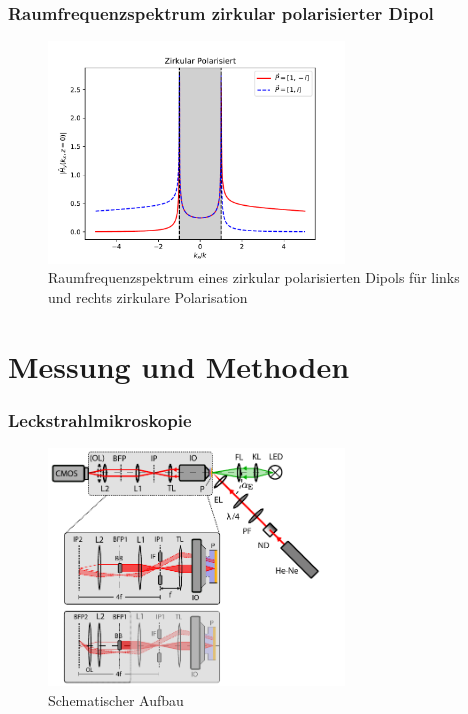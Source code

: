 \documentclass[aspectratio=1610]{beamer}
\begin{document}
		\begin{frame}
			\frametitle{Raumfrequenzspektrum zirkular polarisierter Dipol}
			\begin{figure}[h]
				\centering
				\includegraphics[width=0.7\textwidth]{figures/spatial_spectrum_circ.pdf}
				\caption[Raumfrequenzspektrum zirkular polarisierter Dipol]{Raumfrequenzspektrum eines zirkular polarisierten Dipols für links und rechts zirkulare Polarisation}
			\end{figure}		
		\end{frame}
	\section{Messung und Methoden}
	\begin{frame}
		\frametitle{Leckstrahlmikroskopie}
		\begin{figure}
			\centering
			\includegraphics[width=0.7\textwidth]{figures/Aufbau_Schema.pdf}
			\caption{Schematischer Aufbau}			
		\end{figure}		
	\end{frame}
	
\end{document}
